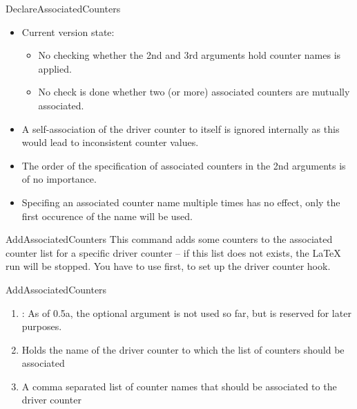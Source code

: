 \documentclass[12pt,paper=a4]{ltxdoc}
\def\packageversion{0.5a}%
\begin{document}
\begin{docCommand}{DeclareAssociatedCounters}{}
\begin{itemize}
  \item Current version state:
    \begin{itemize}
      \item No checking whether the 2nd and 3rd arguments hold counter names is applied.
      \item No check is done whether two (or more) associated counters are mutually associated. 
      \end{itemize}
  \item A self-association of the driver counter to itself is ignored internally as this would lead to inconsistent counter values. 
  \item The order of the specification of associated counters in the 2nd arguments is of no importance.
  \item Specifing an associated counter name multiple times has no effect, only the first occurence of the name will be used.
\end{itemize}

\end{docCommand}


\begin{docCommand}{AddAssociatedCounters}{}
This command adds some counters to the associated counter list for a specific driver counter -- if this list does not exists, the \LaTeX{} run will be stopped. You have to use  first, to set up the driver counter hook.


\begin{docCommandArgs}{AddAssociatedCounters}

\begin{enumerate}[label={\textcolor{blue}{\#\arabic*}}]
  \item {}: As of \packageversion, the optional argument  is not used so far, but is reserved for later purposes.

  \item {} 

    Holds the name of the driver counter to which the list of counters should be associated
\item {}

  A comma separated list of counter names that should be associated to the driver counter
\end{enumerate}
\end{docCommandArgs}



\end{docCommand}%
\end{document}
